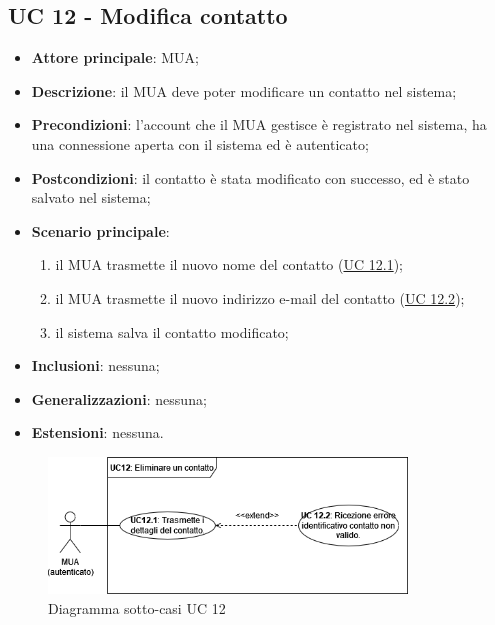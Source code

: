 \subsection{UC 12 - Modifica contatto} \label{sec:UC12}
    \begin{itemize}
        \item \textbf{Attore principale}: MUA;
        \item \textbf{Descrizione}: il MUA deve poter modificare un contatto nel sistema;
        \item \textbf{Precondizioni}: l’account che il MUA gestisce è registrato nel sistema, ha una connessione aperta con il sistema ed è autenticato;
        \item \textbf{Postcondizioni}: il contatto è stata modificato con successo, ed è stato salvato nel sistema;
        \item \textbf{Scenario principale}:
            \begin{enumerate}
                \item il MUA trasmette il nuovo nome del contatto (\hyperref[sec:UC12.1]{UC 12.1});
                \item il MUA trasmette il nuovo indirizzo e-mail del contatto (\hyperref[sec:UC12.2]{UC 12.2});
                \item il sistema salva il contatto modificato;
            \end{enumerate}
        \item \textbf{Inclusioni}: nessuna;
        \item \textbf{Generalizzazioni}: nessuna;
        \item \textbf{Estensioni}: nessuna.
    \end{itemize}

\begin{figure}[h]
    \includegraphics[width=0.85\textwidth]{sections/uc_imgs/UC12.png}
    \centering
    \caption{Diagramma sotto-casi UC 12}
\end{figure}

